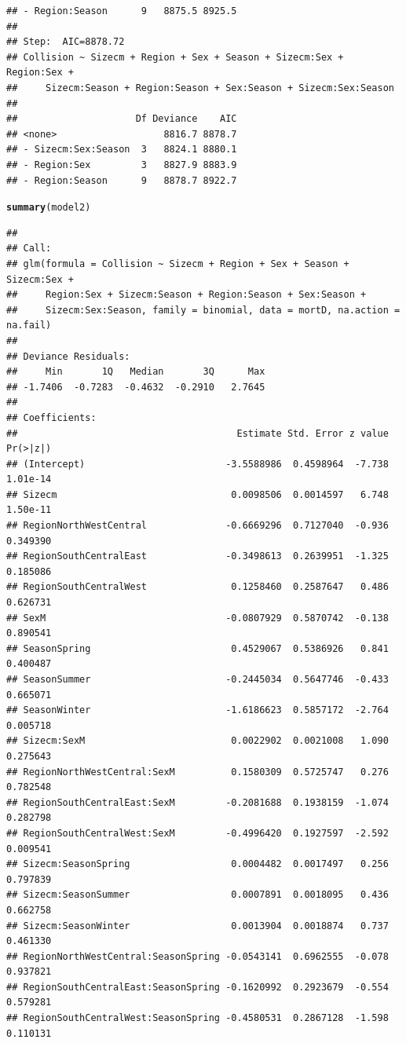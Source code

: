 \documentclass{article}\usepackage[]{graphicx}\usepackage[]{color}
\makeatletter
\newcommand{\hlstd}[1]{\textcolor[rgb]{0.345,0.345,0.345}{#1}}%
\newcommand{\hlkwd}[1]{\textcolor[rgb]{0.737,0.353,0.396}{\textbf{#1}}}%
\newenvironment{kframe}{%
 \def\at@end@of@kframe{}%
 \ifinner\ifhmode%
  \def\at@end@of@kframe{\end{minipage}}%
  \begin{minipage}{\columnwidth}%
 \fi\fi%
 \def\FrameCommand##1{\hskip\@totalleftmargin \hskip-\fboxsep
 \colorbox{shadecolor}{##1}\hskip-\fboxsep
     \hskip-\linewidth \hskip-\@totalleftmargin \hskip\columnwidth}%
 \MakeFramed {\advance\hsize-\width
   \@totalleftmargin\z@ \linewidth\hsize
   \@setminipage}}%
 {\par\unskip\endMakeFramed%
 \at@end@of@kframe}
\newenvironment{knitrout}{}{} %
\makeatother
\begin{document}
\begin{knitrout}
\begin{kframe}
\begin{verbatim}
## - Region:Season      9   8875.5 8925.5
## 
## Step:  AIC=8878.72
## Collision ~ Sizecm + Region + Sex + Season + Sizecm:Sex + Region:Sex + 
##     Sizecm:Season + Region:Season + Sex:Season + Sizecm:Sex:Season
## 
##                     Df Deviance    AIC
## <none>                   8816.7 8878.7
## - Sizecm:Sex:Season  3   8824.1 8880.1
## - Region:Sex         3   8827.9 8883.9
## - Region:Season      9   8878.7 8922.7
\end{verbatim}
\begin{alltt}
\hlkwd{summary}\hlstd{(model2)}
\end{alltt}
\begin{verbatim}
## 
## Call:
## glm(formula = Collision ~ Sizecm + Region + Sex + Season + Sizecm:Sex + 
##     Region:Sex + Sizecm:Season + Region:Season + Sex:Season + 
##     Sizecm:Sex:Season, family = binomial, data = mortD, na.action = na.fail)
## 
## Deviance Residuals: 
##     Min       1Q   Median       3Q      Max  
## -1.7406  -0.7283  -0.4632  -0.2910   2.7645  
## 
## Coefficients:
##                                       Estimate Std. Error z value Pr(>|z|)
## (Intercept)                         -3.5588986  0.4598964  -7.738 1.01e-14
## Sizecm                               0.0098506  0.0014597   6.748 1.50e-11
## RegionNorthWestCentral              -0.6669296  0.7127040  -0.936 0.349390
## RegionSouthCentralEast              -0.3498613  0.2639951  -1.325 0.185086
## RegionSouthCentralWest               0.1258460  0.2587647   0.486 0.626731
## SexM                                -0.0807929  0.5870742  -0.138 0.890541
## SeasonSpring                         0.4529067  0.5386926   0.841 0.400487
## SeasonSummer                        -0.2445034  0.5647746  -0.433 0.665071
## SeasonWinter                        -1.6186623  0.5857172  -2.764 0.005718
## Sizecm:SexM                          0.0022902  0.0021008   1.090 0.275643
## RegionNorthWestCentral:SexM          0.1580309  0.5725747   0.276 0.782548
## RegionSouthCentralEast:SexM         -0.2081688  0.1938159  -1.074 0.282798
## RegionSouthCentralWest:SexM         -0.4996420  0.1927597  -2.592 0.009541
## Sizecm:SeasonSpring                  0.0004482  0.0017497   0.256 0.797839
## Sizecm:SeasonSummer                  0.0007891  0.0018095   0.436 0.662758
## Sizecm:SeasonWinter                  0.0013904  0.0018874   0.737 0.461330
## RegionNorthWestCentral:SeasonSpring -0.0543141  0.6962555  -0.078 0.937821
## RegionSouthCentralEast:SeasonSpring -0.1620992  0.2923679  -0.554 0.579281
## RegionSouthCentralWest:SeasonSpring -0.4580531  0.2867128  -1.598 0.110131

\end{verbatim}
\end{kframe}
\end{knitrout}
\end{document}
